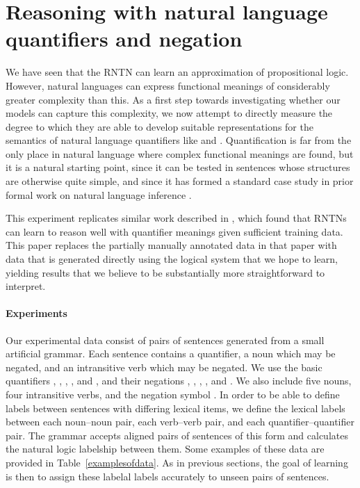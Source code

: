 \section{Reasoning with natural language quantifiers and negation}\label{sec:quantifiers}

We have seen that the RNTN can learn an approximation of propositional
logic.  However, natural languages can express functional meanings of
considerably greater complexity than this.  As a first step towards
investigating whether our models can capture this complexity, we now
attempt to directly measure the degree to which they are able to
develop suitable representations for the semantics of natural language
quantifiers like  and . Quantification is far from
the only place in natural language where complex functional meanings
are found, but it is a natural starting point, since it can be tested
in sentences whose structures are otherwise quite simple, and since it
has formed a standard case study in prior formal work on natural
language inference \cite{Icard:Moss:2013:LILT}.


This experiment replicates similar work described in
\cite{bowman2013can}, which found that RNTNs can learn to reason well
with quantifier meanings given sufficient training data. This paper
replaces the partially manually annotated data in that paper with data
that is generated directly using the logical system that we hope to
learn, yielding results that we believe to be substantially more
straightforward to interpret.

\paragraph{Experiments}
Our experimental data consist of pairs of sentences generated from a
small artificial grammar. Each sentence contains a quantifier, a noun
which may be negated, and an intransitive verb which may be
negated. We use the basic quantifiers , , ,
, and , and their negations , ,
, , and . We also
include five nouns, four intransitive verbs, and the negation symbol
. In order to be able to define labels between sentences
with differing lexical items, we define the lexical labels between
each noun--noun pair, each verb--verb pair, and each
quantifier--quantifier pair. The grammar accepts aligned pairs of
sentences of this form and calculates the natural logic labelship
between them.  Some examples of these data are provided in
Table~\ref{examplesofdata}.  As in previous sections, the goal of
learning is then to assign these labelal labels accurately to
unseen pairs of sentences.

